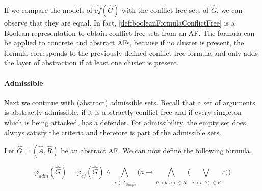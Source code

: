 If we compare the models of $\hat{cf}(\hat{G})$ with the conflict-free sets of $\hat{G}$, we can observe that they are equal. In fact, \cref{def:booleanFormulaConflictFree} is a Boolean representation to obtain conflict-free sets from an AF. The formula can be applied to concrete and abstract AFs, because if no cluster is present, the formula corresponds to the previously defined conflict-free formula and only adds the layer of abstraction if at least one cluster is present.


\paragraph{Admissible} Next we continue with (abstract) admissible sets. Recall that a set of arguments is abstractly admissible, if it is abstractly conflict-free and if every singleton which is being attacked, has a defender. For admissibility, the empty set does always satisfy the criteria and therefore is part of the admissible sets.

\begin{definition}
    Let $\hat{G}=(\hat{A}, \hat{R})$ be an abstract AF. We can now define the following formula.
    \begin{center}
        \[ \varphi_{adm}(\hat{G})=
        \varphi_{cf}(\hat{G}) \land  \bigwedge_{a \in \hat{A}_{\mathit{Single}}} \big( a \rightarrow \bigwedge_{b:(b,a) \in \hat{R}} \big( \bigvee_{c:(c,b) \in \hat{R}} c\big) \big)
        \]
    \end{center}
    \label{def:booleanFormulaAdmissible}
\end{definition}


